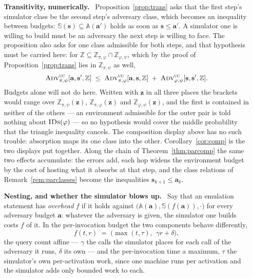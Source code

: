 \documentclass[11pt,a4paper]{article}
\newcommand{\bd}[1]{\mathbf{#1}}
\newcommand{\advtg}{\op{Adv}}
\newcommand{\Aset}{\mathbb{A}}
\newcommand{\SimSet}{\mathbb{S}}
\newcommand{\ZenvSet}{\mathbb{Z}}
\newcommand{\op}[1]{\textsc{#1}}
\newcommand{\IDs}{\op{IDs}}
\newcommand{\heading}[1]{\medskip\par\noindent\textcolor{accent}{\textbf{#1.}}\ }
\theoremstyle{accentdef}
\theoremstyle{accentplain}
\begin{document}
\heading{Transitivity, numerically} Proposition~\ref{prop:trans} asks that the first step's
simulator class be the second step's adversary class, which becomes an inequality between
budgets: $\SimSet(\bd{s}) \subseteq \Aset(\bd{a}')$ holds as soon as $\bd{s} \leq \bd{a}'$. A
simulator one is willing to build must be an adversary the next step is willing to face. The
proposition also asks for one class admissible for both steps, and that hypothesis must be
carried here: for $\ZenvSet \subseteq \ZenvSet_{\pi,\varphi} \cap \ZenvSet_{\varphi,\psi}$, which
by the proof of Proposition~\ref{prop:trans} lies in $\ZenvSet_{\pi,\psi}$ as well,
\[
  \advtg^{\op{uc}}_{\pi,\psi}[\bd{a},\bd{s}',\ZenvSet]
  \;\leq\;
  \advtg^{\op{uc}}_{\pi,\varphi}[\bd{a},\bd{s},\ZenvSet]
  \;+\;
  \advtg^{\op{uc}}_{\varphi,\psi}[\bd{s},\bd{s}',\ZenvSet] .
\]
Budgets alone will not do here. Written with $\bd{z}$ in all three places the brackets would
range over $\ZenvSet_{\pi,\psi}(\bd{z})$, $\ZenvSet_{\pi,\varphi}(\bd{z})$ and
$\ZenvSet_{\varphi,\psi}(\bd{z})$, and the first is contained in neither of the others --- an
environment admissible for the outer pair is told nothing about $\IDs(\varphi)$ --- so no
hypothesis would cover the middle probability that the triangle inequality cancels. The
composition display above has no such trouble: absorption maps its one class into the other.
Corollary~\ref{cor:comp} is the two displays put together. Along the chain of
Theorem~\ref{thm:parcomp} the same two effects accumulate: the errors add, each hop widens the
environment budget by the cost of hosting what it absorbs at that step, and the class relations
of Remark~\ref{rem:parclasses} become the inequalities $\bd{s}_{k+1} \leq \bd{a}_k$.

\heading{Nesting, and whether the simulator blows up} Say that an emulation statement has
\emph{overhead} $f$ if it holds against $\bigl(\Aset(\bd{a}),\SimSet(f(\bd{a})),\cdot\bigr)$ for
every adversary budget $\bd{a}$: whatever the adversary is given, the simulator one builds costs
$f$ of it. In the per-invocation budget the two components behave differently,
\[
  f(t,r) \;=\; \bigl(\max(t,\tau),\ \ \gamma r + \delta\bigr) ,
\]
the query count affine --- $\gamma$ the calls the simulator places for each call of the adversary
it runs, $\delta$ its own --- and the per-invocation time a maximum, $\tau$ the simulator's own
per-activation work, since one machine runs per activation and the simulator adds only bounded
work to each.
\end{document}
